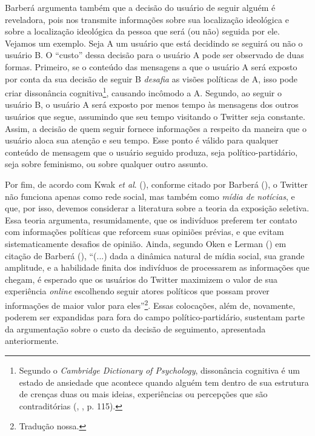 \documentclass[
	12pt,				%
	openright,			%
	twoside,			%
	a4paper,			%
	english,			%
	brazil				%
	]{abntex2}
\begin{document}
 Barberá argumenta também que a decisão do usuário de seguir alguém é reveladora, pois nos transmite informações sobre sua localização ideológica e sobre a localização ideológica da pessoa que será (ou não) seguida por ele. Vejamos um exemplo. Seja A um usuário que está decidindo se seguirá ou não o usuário B. O ``custo'' dessa decisão para o usuário A pode ser observado de duas formas. Primeiro, se o conteúdo das mensagens a que o usuário A será exposto por conta da sua decisão de seguir B \emph{desafia} as visões políticas de A, isso pode criar dissonância cognitiva\footnote{Segundo o \textit{Cambridge Dictionary of Psychology}, dissonância cognitiva é um estado de ansiedade que acontece quando alguém tem dentro de sua estrutura de crenças duas ou mais ideias, experiências ou percepções que são contraditórias (, \citeyear{cambridgedis2009}, p. 115).}, causando incômodo a A. Segundo, ao seguir o usuário B, o usuário A será exposto por menos tempo às mensagens dos outros usuários que segue, assumindo que seu tempo visitando o Twitter seja constante. Assim, a decisão de quem seguir fornece informações a respeito da maneira que o usuário aloca sua atenção e seu tempo. Esse ponto é válido para qualquer conteúdo de mensagem que o usuário seguido produza, seja político-partidário, seja sobre feminismo, ou sobre qualquer outro assunto.
 
 Por fim, de acordo com Kwak \textit{et al}. (\citeyear{kwak2010}), conforme citado por Barberá (\citeyear{barbera2015}), o Twitter não funciona apenas como rede social, mas também como \emph{mídia de notícias}, e que, por isso, devemos considerar a literatura sobre a teoria da exposição seletiva. Essa teoria argumenta, resumidamente, que os indivíduos preferem ter contato com informações políticas que reforcem suas opiniões prévias, e que evitam sistematicamente desafios de opinião. Ainda, segundo Oken e Lerman (\citeyear{oken2012}) em citação de Barberá (\citeyear{barbera2015}), “(...) dada a dinâmica natural de mídia social, sua grande amplitude, e a habilidade finita dos indivíduos de processarem as informações que chegam, é esperado que os usuários do Twitter maximizem o valor de sua experiência \textit{online} escolhendo seguir atores políticos que possam prover informações de maior valor para eles”\footnote{Tradução nossa.}. Essas colocações, além de, novamente, poderem ser expandidas para fora do campo político-partidário, sustentam parte da argumentação sobre o custo da decisão de seguimento, apresentada anteriormente.
 
\end{document}
